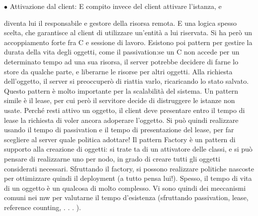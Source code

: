 $\bullet$ Attivazione dal client: E compito invece del client attivare l'istanza, e

diventa lui il responsabile e gestore della risorsa remota. E una logica
spesso scelta, che garantisce al client di utilizzare un'entità a lui riservata.
Si ha però un accoppiamento forte fra C e sessione di lavoro.
Esistono poi pattern per gestire la durata della vita degli oggetti, come il passivation:se un C non accede per un
determinato tempo ad una sua risorsa, il
server potrebbe decidere di farne lo store da qualche parte, e liberarne le risorse
per altri oggetti. Alla richiesta dell'oggetto, il server si preoccuperò di riattia
varlo, ricaricando lo stato salvato. Questo pattern è molto importante per la
scalabilità del sistema.
Un pattern simile è il lease, per cui però il servitore decide di distruggere le
istanze non usate. Perché resti attivo un oggetto, il client deve presentare entro
il tempo di lease la richiesta di voler ancora adoperare l'oggetto. Si può quindi
realizzare usando il tempo di passivation e il tempo di presentazione del lease,
per far scegliere al server quale politica adottare!
Il pattern Factory è un pattern di supporto alla creazione di oggetti: si trate
ta di un attivatore delle classi, e si può pensare di realizzarne uno per nodo,
in grado di creare tutti gli oggetti considerati necessari. Sfruttando il factory,
si possono realizzare politiche nascoste per ottimizzare quindi il deployment (a
tutto pensa lui!).
Spesso, il tempo di vita di un oggetto è un qualcosa di molto complesso. Vi
sono quindi dei meccanismi comuni nei mw per valutarne il tempo d'esistenza
(sfruttando passivation, lease, reference counting, . . . ).
